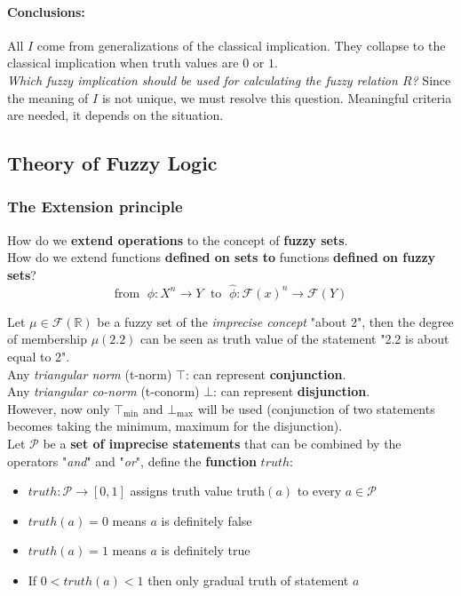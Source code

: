 \paragraph{Conclusions:} All $I$ come from generalizations of the classical implication. They collapse to the classical implication when truth values are $0$ or $1$. \\

\textit{Which fuzzy implication should be used for calculating the fuzzy relation $R$?} Since the meaning of $I$ is not unique, we must resolve this question. Meaningful criteria are needed, it depends on the situation. \\

\newpage


\newpage

\subsection{Theory of Fuzzy Logic}

\subsubsection{The Extension principle}

How do we \textbf{extend operations} to the concept of \textbf{fuzzy sets}.\\

How do we extend functions \textbf{defined on sets to} functions \textbf{defined on fuzzy sets}?
$$ \text{from } \; \phi : X^n \rightarrow Y \; \text{ to } \; \hat \phi : \mathcal{F} (x)^n \rightarrow \mathcal{F} (Y) $$

Let $\mu \in \mathcal{F} (\mathbb{R})$ be a fuzzy set of the \textit{imprecise concept} "about 2", then the degree of membership $\mu (2.2)$ can be seen as truth value of the statement "2.2 is about equal to 2".\\

Any \textit{triangular norm} (t-norm) $\top$: can represent \textbf{conjunction}.\\
Any \textit{triangular co-norm} (t-conorm) $\bot$: can represent \textbf{disjunction}.\\
However, now only $\top_{\min}$ and $\bot_{\max}$ will be used (conjunction of two statements becomes taking the minimum, maximum for the disjunction).\\

Let $\mathcal{P}$ be a \textbf{set of imprecise statements} that can be combined by the operators "\textit{and}" and "\textit{or}", define the \textbf{function} $truth$:
\begin{itemize}
	\item $truth: \mathcal{P} \rightarrow [0,1]$ assigns truth value truth$(a)$ to every $a \in \mathcal{P}$
	\item $truth(a) = 0$ means $a$ is definitely false
	\item $truth(a) = 1$ means $a$ is definitely true
	\item If $0 < truth(a) < 1$ then only gradual truth of statement $a$ 
\end{itemize}

